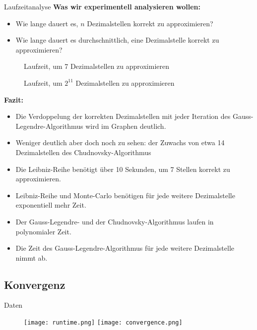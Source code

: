 \documentclass[9pt, t]{beamer}
\begin{document}
\begin{frame}[allowframebreaks]{Laufzeitanalyse}
    \textbf{Was wir experimentell analysieren wollen:}
    \begin{itemize}
        \item Wie lange dauert es, \(n\) Dezimalstellen korrekt zu
              approximieren?
        \item Wie lange dauert es durchschnittlich, eine Dezimalstelle korrekt
              zu approximieren?
    \end{itemize}
    \begin{figure}[H]
        \centering
        
        \caption{Laufzeit, um 7 Dezimalstellen zu approximieren}
    \end{figure}
    \framebreak
    \begin{figure}[H]
        \centering
        
        \caption{Laufzeit, um \(2^{11}\) Dezimalstellen zu approximieren}
    \end{figure}
    \textbf{Fazit:}
    \begin{itemize}
        \item Die Verdoppelung der korrekten Dezimalstellen mit jeder Iteration
              des Gauss-Legendre-Algorithmus wird im Graphen deutlich.
        \item Weniger deutlich aber doch noch zu sehen: der Zuwachs von etwa 14
              Dezimalstellen des Chudnovsky-Algorithmus
        \item Die Leibniz-Reihe benötigt über 10 Sekunden, um 7 Stellen korrekt
              zu approximieren.
        \item Leibniz-Reihe und Monte-Carlo benötigen für jede weitere
              Dezimalstelle exponentiell mehr Zeit.
        \item Der Gauss-Legendre- und der Chudnovsky-Algorithmus laufen in
              polynomialer Zeit.
        \item Die Zeit des Gauss-Legendre-Algorithmus für jede weitere
              Dezimalstelle nimmt ab.
    \end{itemize}
\end{frame}

\subsection{Konvergenz}

\begin{frame}{Daten}
    \begin{figure}
        \begin{center}
            \leavevmode
            \texttt{[image: runtime.png]}
            \texttt{[image: convergence.png]}
        \end{center}
    \end{figure}
\end{frame}
\end{document}
